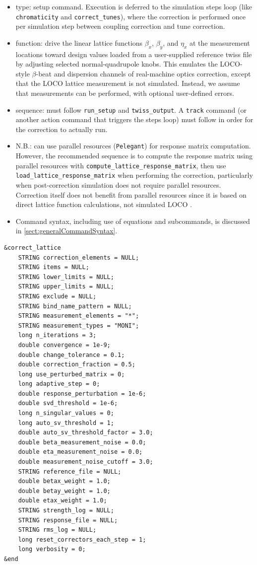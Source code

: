 \documentclass[11pt]{article}
\begin{document}
\begin{itemize}
\item type: setup command.  Execution is deferred to the simulation steps
  loop (like \verb|chromaticity| and \verb|correct_tunes|), where the
  correction is performed once per simulation step between coupling
  correction and tune correction.
\item function: drive the linear lattice functions $\beta_x$, $\beta_y$,
  and $\eta_x$ at the measurement locations toward design values loaded from a
  user-supplied reference twiss file by adjusting selected normal-quadrupole
  knobs.  This emulates the LOCO-style \cite{Safranek-LOCO} $\beta$-beat and dispersion channels
  of real-machine optics correction, except that the LOCO lattice measurement is not simulated.
  Instead, we assume that measurements can be performed, with optional user-defined errors.
\item sequence: must follow \verb|run_setup| and \verb|twiss_output|.  A
  \verb|track| command (or another action command that triggers the steps
  loop) must follow in order for the correction to actually run.
\item N.B.: can use parallel resources (\verb|Pelegant|) for response matrix computation.
  However, the recommended sequence is to compute the response
  matrix using parallel resources with \verb|compute_lattice_response_matrix|,
  then use \verb|load_lattice_response_matrix| when performing the
  correction, particularly when post-correction simulation does not require parallel resources.
  Correction itself does not benefit from parallel resources since it is based on direct lattice
  function calculations, not simulated LOCO \cite{Safranek-LOCO}.
\item Command syntax, including use of equations and subcommands, is discussed in \ref{sect:generalCommandSyntax}.
\end{itemize}

\begin{verbatim}
&correct_lattice
    STRING correction_elements = NULL;
    STRING items = NULL;
    STRING lower_limits = NULL;
    STRING upper_limits = NULL;
    STRING exclude = NULL;
    STRING bind_name_pattern = NULL;
    STRING measurement_elements = "*";
    STRING measurement_types = "MONI";
    long n_iterations = 3;
    double convergence = 1e-9;
    double change_tolerance = 0.1;
    double correction_fraction = 0.5;
    long use_perturbed_matrix = 0;
    long adaptive_step = 0;
    double response_perturbation = 1e-6;
    double svd_threshold = 1e-6;
    long n_singular_values = 0;
    long auto_sv_threshold = 1;
    double auto_sv_threshold_factor = 3.0;
    double beta_measurement_noise = 0.0;
    double eta_measurement_noise = 0.0;
    double measurement_noise_cutoff = 3.0;
    STRING reference_file = NULL;
    double betax_weight = 1.0;
    double betay_weight = 1.0;
    double etax_weight = 1.0;
    STRING strength_log = NULL;
    STRING response_file = NULL;
    STRING rms_log = NULL;
    long reset_correctors_each_step = 1;
    long verbosity = 0;
&end
\end{verbatim}
\end{document}
